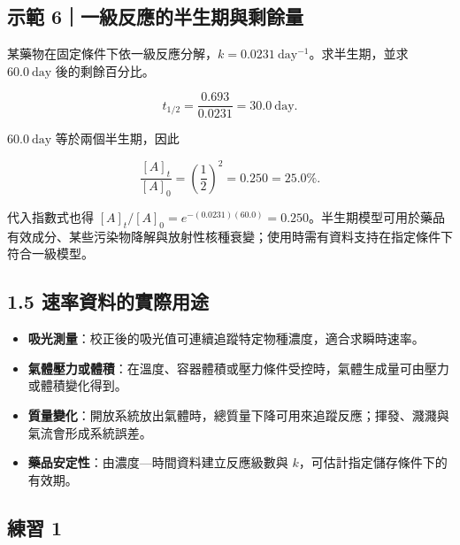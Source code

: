 \documentclass[11pt,a4paper]{article}
\providecommand{\tightlist}{%
  \setlength{\itemsep}{0pt}\setlength{\parskip}{0pt}}
\begin{document}
\begin{HandoutWorkedExample}

\subsection{示範 6｜一級反應的半生期與剩餘量}\label{ux793aux7bc4-6ux4e00ux7d1aux53cdux61c9ux7684ux534aux751fux671fux8207ux5269ux9918ux91cf}

某藥物在固定條件下依一級反應分解，\(k=0.0231\ \mathrm{day^{-1}}\)。求半生期，並求 \(60.0\ \mathrm{day}\) 後的剩餘百分比。

\[
t_{1/2}=\frac{0.693}{0.0231}=30.0\ \mathrm{day}.
\]

\(60.0\ \mathrm{day}\) 等於兩個半生期，因此

\[
\frac{[A]_t}{[A]_0}=\left(\frac12\right)^2=0.250=25.0\%.
\]

代入指數式也得 \([A]_t/[A]_0=e^{-(0.0231)(60.0)}=0.250\)。半生期模型可用於藥品有效成分、某些污染物降解與放射性核種衰變；使用時需有資料支持在指定條件下符合一級模型。

\end{HandoutWorkedExample}

\subsection{1.5 速率資料的實際用途}\label{ux901fux7387ux8cc7ux6599ux7684ux5be6ux969bux7528ux9014}

\begin{itemize}
\tightlist
\item
  \textbf{吸光測量}：校正後的吸光值可連續追蹤特定物種濃度，適合求瞬時速率。
\item
  \textbf{氣體壓力或體積}：在溫度、容器體積或壓力條件受控時，氣體生成量可由壓力或體積變化得到。
\item
  \textbf{質量變化}：開放系統放出氣體時，總質量下降可用來追蹤反應；揮發、濺濺與氣流會形成系統誤差。
\item
  \textbf{藥品安定性}：由濃度---時間資料建立反應級數與 \(k\)，可估計指定儲存條件下的有效期。
\end{itemize}

\subsection{練習 1}\label{ux7df4ux7fd2-1}
\end{document}
